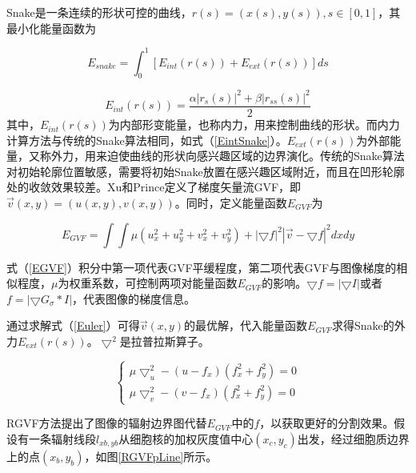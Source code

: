 \documentclass[nomlist,masters]{seuthesix}
\begin{document}
Snake是一条连续的形状可控的曲线，$r(s)=(x(s),y(s)),s\in \left [ 0,1 \right ]$，其最小化能量函数为

\begin{equation}
E_{snake}=\int_{0}^{1}\left [ E_{int}(r(s))+E_{ext}(r(s)) \right ]ds
\label{ESnake}
\end{equation}

\begin{equation}
E_{int}(r(s))=\frac{\alpha \left | r_{s}(s) \right |^{2}+\beta \left | r_{ss}(s) \right |^{2}}{2}
\label{EintSnake}
\end{equation}
其中，$E_{int}(r(s))$为内部形变能量，也称内力，用来控制曲线的形状。而内力计算方法与传统的Snake算法相同，如式（\ref{EintSnake}）。$E_{ext}(r(s))$为外部能量，又称外力，用来迫使曲线的形状向感兴趣区域的边界演化。传统的Snake算法对初始轮廓位置敏感，需要将初始Snake放置在感兴趣区域附近，而且在凹形轮廓处的收敛效果较差。Xu和Prince\cite{Xu1998Snakes}定义了梯度矢量流GVF，即$\vec{v}(x,y)=(u(x,y),v(x,y))$。同时，定义能量函数$E_{GVF}$为

\begin{equation}
E_{GVF}=\int\int \mu(u_{x}^{2}+u_{y}^{2}+v_{x}^{2}+v_{y}^{2})+\left | \bigtriangledown f \right |^{2}\left | \vec{v}- \bigtriangledown f\right |^{2}dxdy
\label{EGVF}
\end{equation}

式（\ref{EGVF}）积分中第一项代表GVF平缓程度，第二项代表GVF与图像梯度的相似程度，$\mu$为权重系数，可控制两项对能量函数$E_{GVF}$的影响。$\bigtriangledown f=\left | \bigtriangledown I \right |$或者$f=\left | \bigtriangledown G_{\sigma } \ast  I \right |$，代表图像的梯度信息。

通过求解式（\ref{Euler}）可得$\vec{v}(x,y)$的最优解，代入能量函数$E_{GVF}$求得Snake的外力$E_{ext}(r(s))$。$\bigtriangledown^{2}$是拉普拉斯算子。

\begin{equation}
\left\{\begin{matrix}
\mu \bigtriangledown _{u}^{2}-(u-f_{x})(f_{x}^{2}+f_{y}^{2})=0\\ 
\mu \bigtriangledown _{v}^{2}-(v-f_{x})(f_{x}^{2}+f_{y}^{2})=0
\end{matrix}\right.
\label{Euler}
\end{equation}

RGVF方法提出了图像的辐射边界图代替$E_{GVF}$中的$f$，以获取更好的分割效果。假设有一条辐射线段$l_{xb,yb}$从细胞核的加权灰度值中心$(x_{c},y_{c})$出发，经过细胞质边界上的点$(x_{b},y_{b})$，如图\ref{RGVFpLine}所示。
\end{document}

